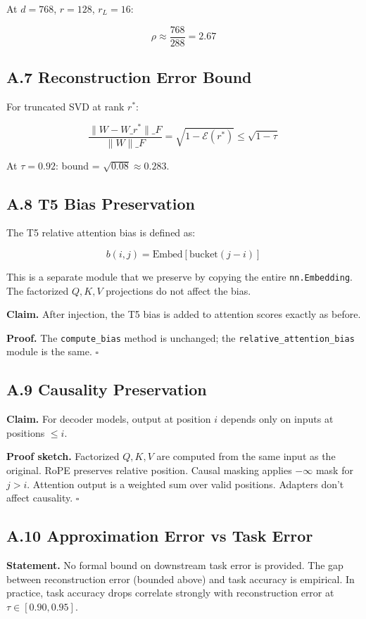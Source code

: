 At $d = 768$, $r = 128$, $r_L = 16$:

\[
\rho \approx \frac{768}{288} = 2.67
\tag{A.9}
\]

\subsection{A.7 Reconstruction Error Bound}

For truncated SVD at rank $r^*$:

\[
\frac{\|W - W\_{r^*}\|\_F}{\|W\|\_F} = \sqrt{1 - \mathcal{E}(r^*)} \leq \sqrt{1 - \tau}
\tag{A.10}
\]

At $\tau = 0.92$: bound = $\sqrt{0.08} \approx 0.283$.

\subsection{A.8 T5 Bias Preservation}

The T5 relative attention bias is defined as:

\[
b(i, j) = \text{Embed}[\text{bucket}(j - i)]
\tag{A.11}
\]

This is a separate module that we preserve by copying the entire \texttt{nn.Embedding}. 
The factorized $Q, K, V$ projections do not affect the bias.

\textbf{Claim.} After injection, the T5 bias is added to attention scores exactly 
as before.

\textbf{Proof.} The \texttt{compute\_bias} method is unchanged; the \texttt{relative\_attention\_bias} 
module is the same. $\square$

\subsection{A.9 Causality Preservation}

\textbf{Claim.} For decoder models, output at position $i$ depends only on inputs 
at positions $\leq i$.

\textbf{Proof sketch.} Factorized $Q, K, V$ are computed from the same input as 
the original. RoPE preserves relative position. Causal masking applies 
$-\infty$ mask for $j > i$. Attention output is a weighted sum over valid 
positions. Adapters don't affect causality. $\square$

\subsection{A.10 Approximation Error vs Task Error}

\textbf{Statement.} No formal bound on downstream task error is provided. The gap 
between reconstruction error (bounded above) and task accuracy is 
empirical. In practice, task accuracy drops correlate strongly with 
reconstruction error at $\tau \in [0.90, 0.95]$.